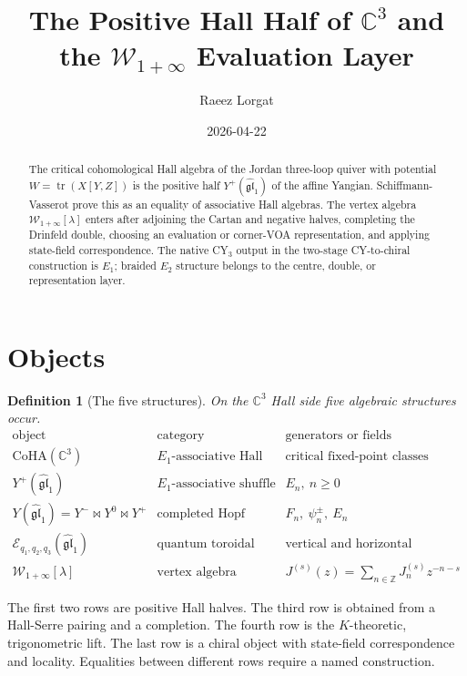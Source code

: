 \documentclass[11pt]{article}
\title{The Positive Hall Half of $\mathbb{C}^3$ and the
$\mathcal{W}_{1+\infty}$ Evaluation Layer}
\author{Raeez Lorgat}
\date{2026-04-22}
\newtheorem{definition}[theorem]{Definition}
\providecommand{\CoHA}{\mathrm{CoHA}}
\providecommand{\gglone}{\widehat{\mathfrak{gl}}_{1}}
\providecommand{\Yp}{Y^{+}}
\providecommand{\Ym}{Y^{-}}
\providecommand{\Yz}{Y^{0}}
\providecommand{\YFull}{Y}
\providecommand{\Wilpha}{\mathcal{W}_{1+\infty}}
\providecommand{\Ecal}{\mathcal{E}}
\providecommand{\Eone}{E_1}
\providecommand{\Etwo}{E_2}
\begin{document}
\maketitle

\begin{abstract}
The critical cohomological Hall algebra of the Jordan three-loop quiver
with potential $W=\operatorname{tr}(X[Y,Z])$ is the positive half
$\Yp(\gglone)$ of the affine Yangian. Schiffmann-Vasserot prove this as
an equality of associative Hall algebras. The vertex algebra
$\Wilpha[\lambda]$ enters after adjoining the Cartan and negative
halves, completing the Drinfeld double, choosing an evaluation or
corner-VOA representation, and applying state-field correspondence. The
native CY$_3$ output in the two-stage CY-to-chiral construction is
$\Eone$; braided $\Etwo$ structure belongs to the centre, double, or
representation layer.
\end{abstract}

\section{Objects}

\begin{definition}[The five structures]
\label{def:five-structures}
On the $\mathbb{C}^3$ Hall side five algebraic structures occur.
\[
\begin{array}{l|l|l}
\text{object} & \text{category} & \text{generators or fields} \\\hline
\CoHA(\mathbb{C}^3) &
\Eone\text{-associative Hall algebra} &
\text{critical fixed-point classes} \\
\Yp(\gglone) &
\Eone\text{-associative shuffle algebra} &
E_n,\ n\geq 0 \\
\YFull(\gglone)=\Ym\bowtie\Yz\bowtie\Yp &
\text{completed Hopf algebra} &
F_n,\ \psi_n^\pm,\ E_n \\
\Ecal_{q_1,q_2,q_3}(\gglone) &
\text{quantum toroidal algebra} &
\text{vertical and horizontal currents} \\
\Wilpha[\lambda] &
\text{vertex algebra} &
J^{(s)}(z)=\sum_{n\in\mathbb{Z}}J^{(s)}_n z^{-n-s}
\end{array}
\]
\end{definition}

The first two rows are positive Hall halves. The third row is obtained
from a Hall-Serre pairing and a completion. The fourth row is the
$K$-theoretic, trigonometric lift. The last row is a chiral object with
state-field correspondence and locality. Equalities between different
rows require a named construction.
\end{document}
